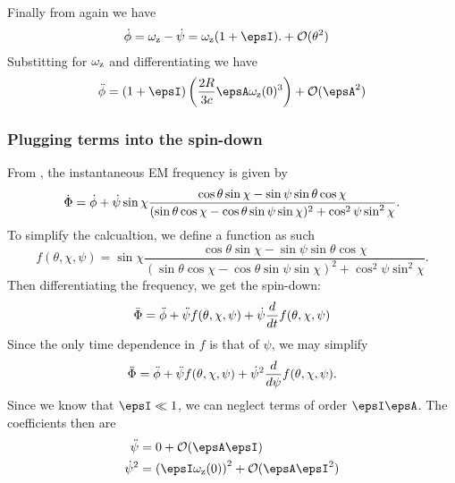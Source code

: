 \documentclass[/home/greg/Thesis/main/main.tex]{subfiles}
\begin{document}
Finally from \citet{Landau1969} again we have
\begin{align}
\dot{\phi} & = \wz - \dot{\psi} = \wz(1 + \epsI). + \mathcal{O}(\theta^{2})
\end{align}
Substitting for $\omega_{\mathrm{z}}$ and differentiating we have
\begin{align}
\ddot{\phi} = (1+\epsI)\left(\frac{2R}{3c} \epsA \wz(0)^{3}\right) + \mathcal{O}(\epsA^{2})
\end{align}

\subsubsection{Plugging terms into the spin-down}
From \citet{Jones2001}, the instantaneous EM frequency is given by 
\begin{equation}
\dot{\Phi} = \dot{\phi} + \dot{\psi} \sin\chi
\frac{\cos\theta\sin\chi - \sin\psi\sin\theta\cos\chi}{
    (\sin\theta\cos\chi - \cos\theta\sin\psi\sin\chi)^{2} + \cos^{2}\psi\sin^{2}\chi}.
\end{equation}
To simplify the calcualtion, we define a function as such
\begin{equation}
f(\theta, \chi, \psi) = \sin\chi
\frac{\cos\theta\sin\chi - \sin\psi\sin\theta\cos\chi}{
    (\sin\theta\cos\chi - \cos\theta\sin\psi\sin\chi)^{2} + \cos^{2}\psi\sin^{2}\chi}.
\end{equation}
Then differentiating the frequency, we get the spin-down:
\begin{align}
\ddot{\Phi} = \ddot{\phi} + \ddot{\psi}f(\theta, \chi, \psi) + \dot{\psi}\frac{d}{dt}f(\theta, \chi, \psi)
\end{align}
Since the only time dependence in $f$ is that of $\psi$, we may simplify
\begin{align}
\ddot{\Phi} = \ddot{\phi} + \ddot{\psi}f(\theta, \chi, \psi) + \dot{\psi}^{2}\frac{d}{d\psi}f(\theta, \chi, \psi).
\end{align}
Since we know  that $\epsI \ll 1$, we can neglect terms of order $\epsI\epsA$. 
The coefficients then are 
\begin{align}
\ddot{\psi} & = 0 + \mathcal{O}(\epsA\epsI) \\
\dot{\psi}^{2} & = \left(\epsI \wz(0)\right)^{2} + \mathcal{O}(\epsA \epsI^{2})
\end{align}
\end{document}
